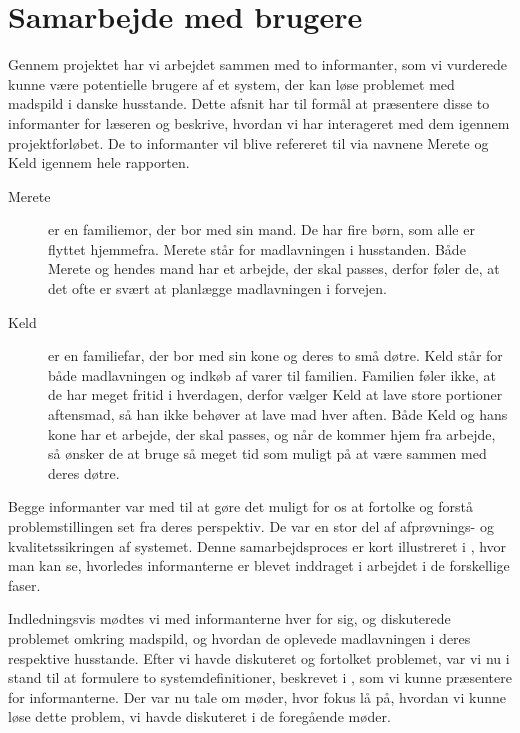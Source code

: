 \section{Samarbejde med brugere}
\label{sec:samarbejde}

Gennem projektet har vi arbejdet sammen med to informanter, som vi vurderede kunne være potentielle brugere af et system, der kan løse problemet med madspild i danske husstande. Dette afsnit har til formål at præsentere disse to informanter for læseren og beskrive, hvordan vi har interageret med dem igennem projektforløbet. De to informanter vil blive refereret til via navnene Merete og Keld igennem hele rapporten.

\begin{description}
\item[Merete] er en familiemor, der bor med sin mand. De har fire børn, som alle er flyttet hjemmefra. Merete står for madlavningen i husstanden. Både Merete og hendes mand har et arbejde, der skal passes, derfor føler de, at det ofte er svært at planlægge madlavningen i forvejen.

\item[Keld] er en familiefar, der bor med sin kone og deres to små døtre. Keld står for både madlavningen og indkøb af varer til familien. Familien føler ikke, at de har meget fritid i hverdagen, derfor vælger Keld at lave store portioner aftensmad, så han ikke behøver at lave mad hver aften. Både Keld og hans kone har et arbejde, der skal passes, og når de kommer hjem fra arbejde, så ønsker de at bruge så meget tid som muligt på at være sammen med deres døtre.
\end{description}

Begge informanter var med til at gøre det muligt for os at fortolke og forstå problemstillingen set fra deres perspektiv. De var en stor del af afprøvnings- og kvalitetssikringen af systemet. Denne samarbejdsproces er kort illustreret i , hvor man kan se, hvorledes informanterne er blevet inddraget i arbejdet i de forskellige faser.

Indledningsvis mødtes vi med informanterne hver for sig, og diskuterede problemet omkring madspild, og hvordan de oplevede madlavningen i deres respektive husstande. Efter vi havde diskuteret og fortolket problemet, var vi nu i stand til at formulere to systemdefinitioner, beskrevet i , som vi kunne præsentere for informanterne. Der var nu tale om møder, hvor fokus lå på, hvordan vi kunne løse dette problem, vi havde diskuteret i de foregående møder. 

